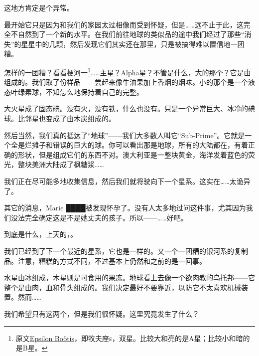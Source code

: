 \begin{scpbox}


这地方肯定是个异常。

最开始它只是因为和我们的家园太过相像而受到怀疑，但是……远不止于此，这完全不自然到了一个新的水平。在我们前往地球的类似品的途中我们经过了那些“消失”的星星中的几颗，然后发现它们其实还在那里，只是被搞得难以置信地一团糟。

怎样的一团糟？看看梗河一\footnote{原文\hyperref[chap:]{Epsilon Boötis}，即牧夫座ε，双星。比较大和亮的是A星；比较小和暗的是B星。}……主星？Alpha星？不管是什么，大的那个？它是由组成的。我们取了份样品——尝起来像牛油果加上香烟的烟味。小的那个是一个液态叶绿素球，不知怎么地保持着自己的完整。

大火星成了固态碘。没有火，没有铁，什么也没有。只是一个异常巨大、冰冷的碘球。比邻星也变成了由木炭组成的。

然后当然，我们真的抵达了“地球”——我们大多数人叫它“Sub-Prime”。它就是一个全是烂摊子和错误的巨大的球。你可以看出那是地球，所有的大陆都在，有着正确的形状，但是组成它们的东西不对。澳大利亚是一整块黄金，海洋发着蓝色的荧光，整块美洲大陆成了枫糖浆……

我们正在尽可能多地收集信息，然后我们就将驶向下一个星系。这实在……太诡异了。

其它的消息，Marie ████被发现怀孕了。没有人太多地过问这件事，尤其因为我们没法完全确定这是不是她丈夫的孩子。所以——……好吧。


\end{scpbox}

\hr

\begin{scpbox}


到底是什么，上天的，。

我们已经到了下一个最近的星系，它也是一样的。又一个一团糟的银河系的复制品。注意，糟糕的方式不同，不过基本上仍然和之前的是一回事。

水星由冰组成，木星则是可食用的果冻。地球看上去像一个欲肉教的乌托邦——它整个是由肉，血和骨头组成的。我们决定最好不要靠近，以防它不太喜欢机械装置。然而……

我们希望只有这两个，但是我们很怀疑。这里究竟发生了什么？


\end{scpbox}

